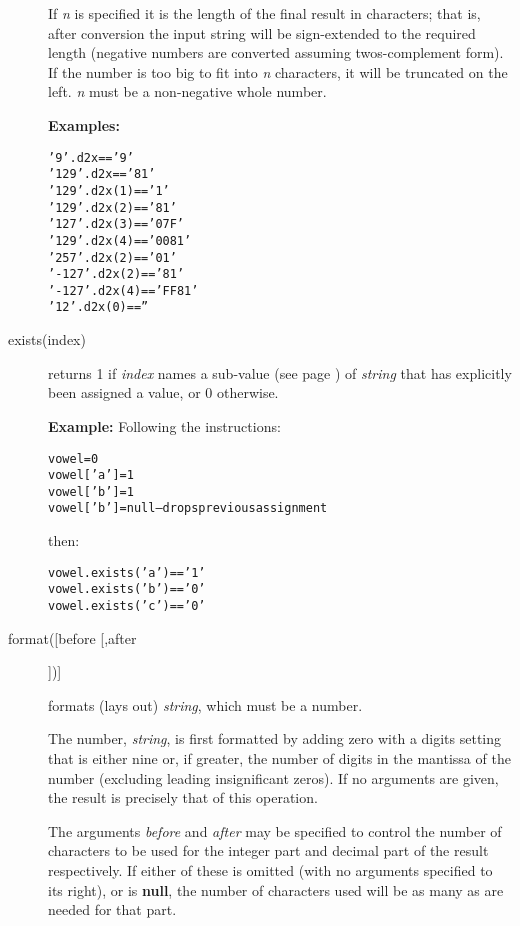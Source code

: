 \begin{description}
If \emph{n} is specified it is the length of the final result in
characters; that is, after conversion the input string will be
sign-extended to the required length (negative numbers are converted
assuming twos-complement form).
If the number is too big to fit into \emph{n} characters, it will be
truncated on the left.
\emph{n} must be a non-negative whole number.
 
\textbf{Examples:}
\begin{alltt}
'9'.d2x       == '9'
'129'.d2x     == '81'
'129'.d2x(1)  == '1'
'129'.d2x(2)  == '81'
'127'.d2x(3)  == '07F'
'129'.d2x(4)  == '0081'
'257'.d2x(2)  == '01'
'-127'.d2x(2) == '81'
'-127'.d2x(4) == 'FF81'
'12'.d2x(0)   == ''
\end{alltt}
\item[exists(index)]\label{refexists}

returns 1 if \emph{index} names a  sub-value (see page \pageref{refinstr})  of
\emph{string} that has explicitly been assigned a value, or 0
otherwise.
 
\textbf{Example:}
 Following the instructions:
\begin{alltt}
vowel=0
vowel['a']=1
vowel['b']=1
vowel['b']=null -- drops previous assignment
\end{alltt}
then:
\begin{alltt}
vowel.exists('a') == '1'
vowel.exists('b') == '0'
vowel.exists('c') == '0'
\end{alltt}
\item[format([before [,after]])]\label{refformat}

formats (lays out) \emph{string}, which must be a number.
 
The number, \emph{string}, is first formatted by adding zero with a
digits setting that is either nine or, if greater, the number of digits
in the mantissa of the number (excluding leading insignificant zeros).
If no arguments are given, the result is precisely that of this
operation.
 
The arguments \emph{before} and \emph{after} may be specified to
control the number of characters to be used for the integer part and
decimal part of the result respectively.  If either of these is omitted
(with no arguments specified to its right), or is \textbf{null}, the
number of characters used will be as many as are needed for that part.
 

\end{description}
